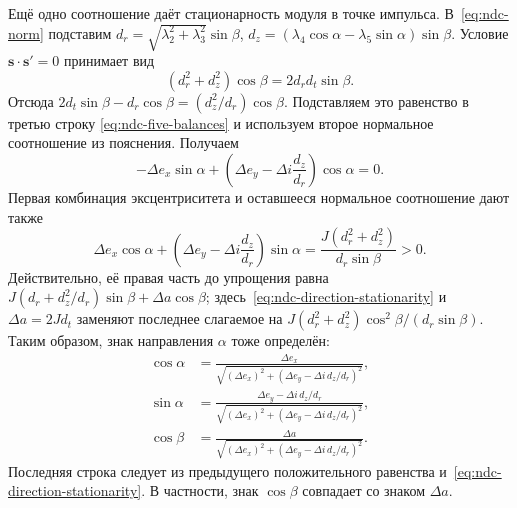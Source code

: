 Ещё одно соотношение даёт стационарность модуля в точке импульса.
В~\eqref{eq:ndc-norm} подставим
$d_r=\sqrt{\lambda_2^2+\lambda_3^2}\sin\beta$,
$d_z=(\lambda_4\cos\alpha-\lambda_5\sin\alpha)\sin\beta$.
Условие $\boldsymbol s\cdot\boldsymbol s'=0$ принимает вид
\begin{equation}
 (d_r^2+d_z^2)\cos\beta=2d_rd_t\sin\beta.
 \label{eq:ndc-direction-stationarity}
\end{equation}
Отсюда
$2d_t\sin\beta-d_r\cos\beta=(d_z^2/d_r)\cos\beta$.
Подставляем это равенство в третью строку
\eqref{eq:ndc-five-balances} и используем второе нормальное
соотношение из пояснения. Получаем
\[
 -\Delta e_x\sin\alpha+
       \left(\Delta e_y-\Delta i\frac{d_z}{d_r}\right)\cos\alpha=0.
\]
Первая комбинация эксцентриситета и оставшееся нормальное
соотношение дают также
\[
 \Delta e_x\cos\alpha+
       \left(\Delta e_y-\Delta i\frac{d_z}{d_r}\right)\sin\alpha
 =\frac{J(d_r^2+d_z^2)}{d_r\sin\beta}>0.
\]
Действительно, её правая часть до упрощения равна
$J(d_r+d_z^2/d_r)\sin\beta+\Delta a\cos\beta$;
здесь~\eqref{eq:ndc-direction-stationarity} и
$\Delta a=2Jd_t$ заменяют последнее слагаемое на
$J(d_r^2+d_z^2)\cos^2\beta/(d_r\sin\beta)$.
Таким образом, знак направления $\alpha$ тоже определён:
\begin{equation}
\begin{aligned}
 \cos\alpha&=\frac{\Delta e_x}
 {\sqrt{(\Delta e_x)^2+(\Delta e_y-\Delta i\,d_z/d_r)^2}},\\
 \sin\alpha&=\frac{\Delta e_y-\Delta i\,d_z/d_r}
 {\sqrt{(\Delta e_x)^2+(\Delta e_y-\Delta i\,d_z/d_r)^2}},\\
 \cos\beta&=\frac{\Delta a}
 {\sqrt{(\Delta e_x)^2+(\Delta e_y-\Delta i\,d_z/d_r)^2}}.
\end{aligned}
\label{eq:ndc-angles-via-directions}
\end{equation}
Последняя строка следует из предыдущего положительного равенства
и~\eqref{eq:ndc-direction-stationarity}. В частности, знак
$\cos\beta$ совпадает со знаком $\Delta a$.

